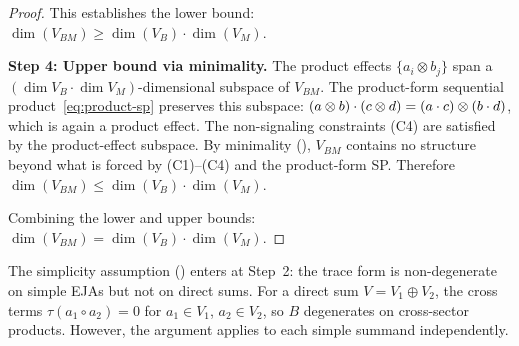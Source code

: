 \begin{proof}
This establishes the lower bound:
$\dim(V_{BM}) \geq \dim(V_{B}) \cdot \dim(V_{M})$.

\medskip
\textbf{Step 4: Upper bound via minimality.}
The product effects $\{a_{i} \otimes b_{j}\}$ span a
$(\dim V_{B} \cdot \dim V_{M})$-dimensional subspace of $V_{BM}$.
The product-form sequential product~\eqref{eq:product-sp} preserves
this subspace: $\sp{(a \otimes b)}{(c \otimes d)} =
(\sp{a}{c}) \otimes (\sp{b}{d})$, which is again a product effect.
The non-signaling constraints (C4) are satisfied by the
product-effect subspace.  By
minimality (), $V_{BM}$ contains no
structure beyond what is forced by (C1)--(C4) and the product-form SP.
Therefore $\dim(V_{BM}) \leq \dim(V_{B}) \cdot \dim(V_{M})$.

\medskip
Combining the lower and upper bounds:
$\dim(V_{BM}) = \dim(V_{B}) \cdot \dim(V_{M})$.
\end{proof}

\begin{remark}
The simplicity assumption () enters at Step~2:
the trace form is non-degenerate on simple EJAs but not on direct
sums.  For a direct sum $V = V_{1} \oplus V_{2}$, the cross terms
$\tau(a_{1} \circ a_{2}) = 0$ for $a_{1} \in V_{1}$,
$a_{2} \in V_{2}$, so $B$ degenerates on cross-sector products.
However, the argument applies to each simple summand independently.
\end{remark}
